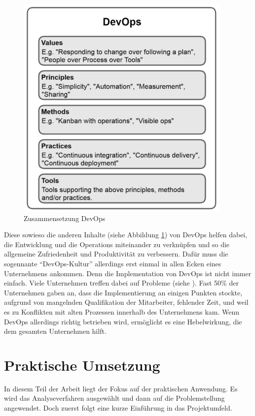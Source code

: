 \begin{figure}[h!]
	\centering
	\includegraphics[scale = 0.7]{img/DEVOPS.png}
	\caption{Zusammensetzung DevOps}
	\label{img:devops}
\end{figure}Diese sowieso die anderen Inhalte (siehe Abbildung \ref{img:devops}) von DevOps helfen dabei, die Entwicklung und die Operations miteinander zu verknüpfen und so die allgemeine Zufriedenheit und Produktivität zu verbessern. Dafür muss die sogennante \enquote{DevOps-Kultur} allerdings erst einmal in allen Ecken eines Unternehmens ankommen.\autocite[Vgl.][S.23]{Stahl.2018} Denn die Implementation von DevOps ist nicht immer einfach. Viele Unternehmen treffen dabei auf Probleme (siehe \cite{Claranet.2016}). Fast 50\% der Unternehmen gaben an, dass die Implementierung an einigen Punkten stockte, aufgrund von mangelnden Qualifikation der Mitarbeiter, fehlender Zeit, und weil es zu Konflikten mit alten Prozessen innerhalb des Unternehmens kam.\autocite[Vgl.][]{Claranet.2016} Wenn DevOps allerdings richtig betrieben wird, ermöglicht es eine Hebelwirkung, die dem gesamten Unternehmen hilft.\autocite[Vgl.][S.24]{Stahl.2018} 
\chapter{Praktische Umsetzung}
In diesem Teil der Arbeit liegt der Fokus auf der praktischen Anwendung. Es wird das Analyseverfahren ausgewählt und dann auf die Problemstellung angewendet. Doch zuerst folgt eine kurze Einführung in das Projektumfeld.
